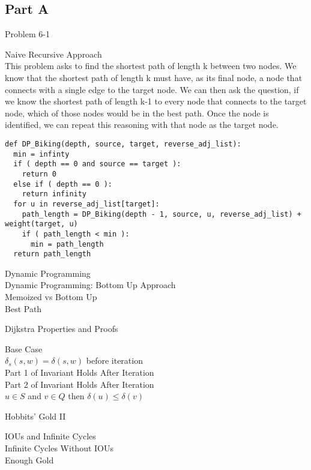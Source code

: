 \documentclass[12pt,twoside]{article}
\begin{document}
\begin{problems}

\section*{Part A}
\problem Problem 6-1
\begin{problemparts}
\problempart Naive Recursive Approach\\
This problem asks to find the shortest path of length k between two nodes.  We know that the shortest path of length k must have, as its final node, a node that connects with a single edge to the target node.  We can then ask the question, if we know the shortest path of length k-1 to every node that connects to the target node, which of those nodes would be in the best path.  Once the node is identified, we can repeat this reasoning with that node as the target node.\\

\begin{lstlisting}
def DP_Biking(depth, source, target, reverse_adj_list):
  min = infinty
  if ( depth == 0 and source == target ): 
    return 0
  else if ( depth == 0 ):
    return infinity
  for u in reverse_adj_list[target]:
    path_length = DP_Biking(depth - 1, source, u, reverse_adj_list) + weight(target, u)
    if ( path_length < min ):
      min = path_length
  return path_length
\end{lstlisting} 
\problempart Dynamic Programming\\
\problempart Dynamic Programming: Bottom Up Approach\\
\problempart Memoized vs Bottom Up\\
\problempart Best Path\\
\end{problemparts}
\problem Dijkstra Properties and Proofs
\begin{problemparts}
\problempart Base Case\\
\problempart $\delta_s(s,w) = \delta(s,w)$ before iteration\\
\problempart Part 1 of Invariant Holds After Iteration\\
\problempart Part 2 of Invariant Holds After Iteration\\
\problempart $u \in S$ and $v \in Q$ then $\delta(u) \le \delta(v)$\\
\end{problemparts}
\problem Hobbits' Gold II
\begin{problemparts}
\problempart IOUs and Infinite Cycles\\
\problempart Infinite Cycles Without IOUs\\
\problempart Enough Gold\\
\end{problemparts}
\end{problems}
\end{document}
